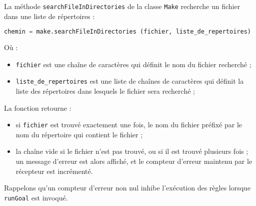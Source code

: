 \documentclass[a4paper,11pt]{extarticle}
\begin{document}
La méthode \texttt{searchFileInDirectories} de la classe \texttt{Make} recherche un fichier dans une liste de répertoires :
\begin{lstlisting}[language=py]
chemin = make.searchFileInDirectories (fichier, liste_de_repertoires)
\end{lstlisting}
Où :
\begin{itemize}
  \item \texttt{fichier} est une chaîne de caractères qui définit le nom du fichier recherché ;
  \item \texttt{liste\_de\_repertoires} est une liste de chaînes de caractères qui définit la liste des répertoires dans lesquels le fichier sera recherché ;
\end{itemize}
La fonction retourne :
\begin{itemize}
  \item si \texttt{fichier} est trouvé exactement une fois, le nom du fichier préfixé par le nom du répertoire qui contient le fichier ;
  \item la chaîne vide si le fichier n'est pas trouvé, ou si il est trouvé plusieurs fois ; un message d'erreur est alors affiché, et le compteur d'erreur maintenu par le récepteur est incrémenté.
\end{itemize}

Rappelons qu'un compteur d'erreur non nul inhibe l'exécution des règles lorsque \texttt{runGoal} est invoqué.


\end{document}
